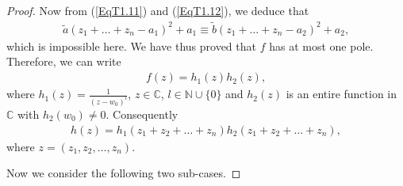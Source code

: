 \documentclass[11pt,reqno]{amsart}
\numberwithin{equation}{section}
\begin{document}
\begin{proof}
Now from (\ref{EqT1.11}) and (\ref{EqT1.12}), we deduce that
\begin{align*}
\tilde a \left(z_1+\ldots+z_n-a_1\right)^2+a_1\equiv \tilde b\left(z_1+\ldots+z_n-a_2\right)^2+a_2,
\end{align*}
which is impossible here. We have thus proved that $f$ has at most one pole. Therefore, we can write
\begin{align}\label{EqT1.12a}
f(z)=h_1(z)h_2(z),
\end{align}
where $h_1(z)=\frac{1}{(z-w_0)^l}$, $z\in\mathbb{C}$, $l\in\mathbb{N}\cup\{0\}$ and $h_2(z)$ is an entire function in $\mathbb{C}$ with
$h_2(w_0)\neq 0$. Consequently
\begin{align}\label{EqT1.13}
h(z)=h_1(z_1+z_2+\ldots+z_n)h_2(z_1+z_2+\ldots+z_n),
\end{align}
where $z=(z_1,z_2,\ldots,z_n)$.

Now we consider the following two sub-cases.



\end{proof}
\end{document}
